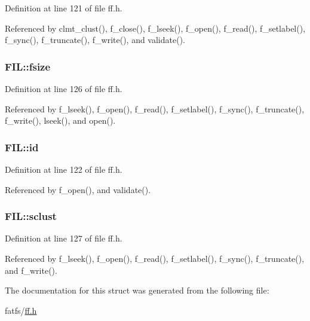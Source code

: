 Definition at line 121 of file ff.\+h.



Referenced by clmt\+\_\+clust(), f\+\_\+close(), f\+\_\+lseek(), f\+\_\+open(), f\+\_\+read(), f\+\_\+setlabel(), f\+\_\+sync(), f\+\_\+truncate(), f\+\_\+write(), and validate().

\subsubsection[{\texorpdfstring{fsize}{fsize}}]{ F\+I\+L\+::fsize}\hypertarget{structFIL_aa00790d40d7b0081c345fd4f76e22b70}{}\label{structFIL_aa00790d40d7b0081c345fd4f76e22b70}


Definition at line 126 of file ff.\+h.



Referenced by f\+\_\+lseek(), f\+\_\+open(), f\+\_\+read(), f\+\_\+setlabel(), f\+\_\+sync(), f\+\_\+truncate(), f\+\_\+write(), lseek(), and open().

\subsubsection[{\texorpdfstring{id}{id}}]{ F\+I\+L\+::id}\hypertarget{structFIL_af7cae0063b0045fb7078b560101ba8f2}{}\label{structFIL_af7cae0063b0045fb7078b560101ba8f2}


Definition at line 122 of file ff.\+h.



Referenced by f\+\_\+open(), and validate().

\subsubsection[{\texorpdfstring{sclust}{sclust}}]{ F\+I\+L\+::sclust}\hypertarget{structFIL_ad308b74c8d6975c6a9c30d90b4124c40}{}\label{structFIL_ad308b74c8d6975c6a9c30d90b4124c40}


Definition at line 127 of file ff.\+h.



Referenced by f\+\_\+lseek(), f\+\_\+open(), f\+\_\+read(), f\+\_\+setlabel(), f\+\_\+sync(), f\+\_\+truncate(), and f\+\_\+write().



The documentation for this struct was generated from the following file\+:\begin{DoxyCompactItemize}
\item 
fatfs/\hyperlink{ff_8h}{ff.\+h}\end{DoxyCompactItemize}
